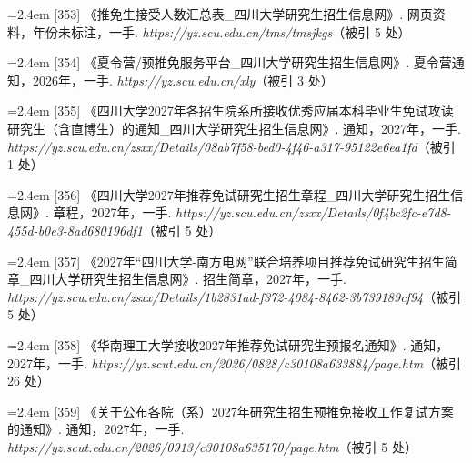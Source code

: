 {\nopagebreak\vspace{1pt}
\noindent\hangindent=2.4em \label{src:S0472}{\color{cAccent}[353]} 《推免生接受人数汇总表\_四川大学研究生招生信息网》. 网页资料，年份未标注，一手. \textit{https://yz.scu.edu.cn/tms/tmsjkgs}（被引 5 处）\par
\vspace{0.6pt}
\noindent\hangindent=2.4em \label{src:S0474}{\color{cAccent}[354]} 《夏令营/预推免服务平台\_四川大学研究生招生信息网》. 夏令营通知，2026年，一手. \textit{https://yz.scu.edu.cn/xly}（被引 3 处）\par
\vspace{0.6pt}
\noindent\hangindent=2.4em \label{src:S0475}{\color{cAccent}[355]} 《四川大学2027年各招生院系所接收优秀应届本科毕业生免试攻读研究生（含直博生）的通知\_四川大学研究生招生信息网》. 通知，2027年，一手. \textit{https://yz.scu.edu.cn/zsxx/Details/08ab7f58-bed0-4f46-a317-95122e6ea1fd}（被引 1 处）\par
\vspace{0.6pt}
\noindent\hangindent=2.4em \label{src:S0476}{\color{cAccent}[356]} 《四川大学2027年推荐免试研究生招生章程\_四川大学研究生招生信息网》. 章程，2027年，一手. \textit{https://yz.scu.edu.cn/zsxx/Details/0f4bc2fc-e7d8-455d-b0e3-8ad680196df1}（被引 5 处）\par
\vspace{0.6pt}
\noindent\hangindent=2.4em \label{src:S0478}{\color{cAccent}[357]} 《2027年“四川大学-南方电网”联合培养项目推荐免试研究生招生简章\_四川大学研究生招生信息网》. 招生简章，2027年，一手. \textit{https://yz.scu.edu.cn/zsxx/Details/1b2831ad-f372-4084-8462-3b739189cf94}（被引 5 处）\par
\vspace{0.6pt}
\vspace{3.5pt}\par
\nopagebreak\vspace{1pt}
\noindent\hangindent=2.4em \label{src:S0479}{\color{cAccent}[358]} 《华南理工大学接收2027年推荐免试研究生预报名通知》. 通知，2027年，一手. \textit{https://yz.scut.edu.cn/2026/0828/c30108a633884/page.htm}（被引 26 处）\par
\vspace{0.6pt}
\noindent\hangindent=2.4em \label{src:S0480}{\color{cAccent}[359]} 《关于公布各院（系）2027年研究生招生预推免接收工作复试方案的通知》. 通知，2027年，一手. \textit{https://yz.scut.edu.cn/2026/0913/c30108a635170/page.htm}（被引 5 处）\par
}
